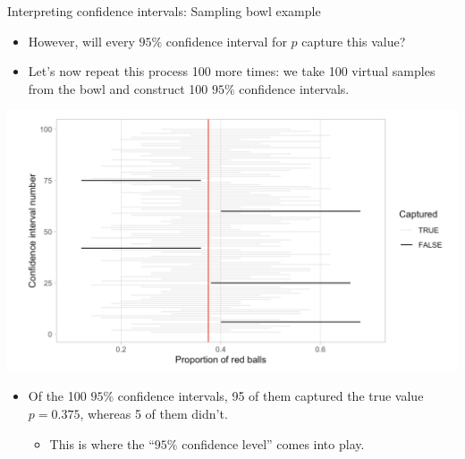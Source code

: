 \documentclass[
  ignorenonframetext,
]{beamer}
\providecommand{\tightlist}{%
  \setlength{\itemsep}{0pt}\setlength{\parskip}{0pt}}
\begin{document}
\begin{frame}{Interpreting confidence intervals: Sampling bowl example}
\protect\hypertarget{interpreting-confidence-intervals-sampling-bowl-example}{}
\begin{itemize}
\item
  However, will every \(95\%\) confidence interval for \(p\) capture
  this value?
\item
  Let's now repeat this process 100 more times: we take 100 virtual
  samples from the bowl and construct 100 \(95\%\) confidence intervals.
\end{itemize}

\tiny

\begin{center}\includegraphics[width=0.6\linewidth,height=0.4\textheight]{week10_11} \end{center}
\normalsize

\begin{itemize}
\item
  Of the 100 \(95\%\) confidence intervals, 95 of them captured the true
  value \(p=0.375\), whereas 5 of them didn't.

  \begin{itemize}
  \tightlist
  \item
    This is where the ``\(95\%\) confidence level'' comes into play.
  \end{itemize}
\end{itemize}
\end{frame}
\end{document}
